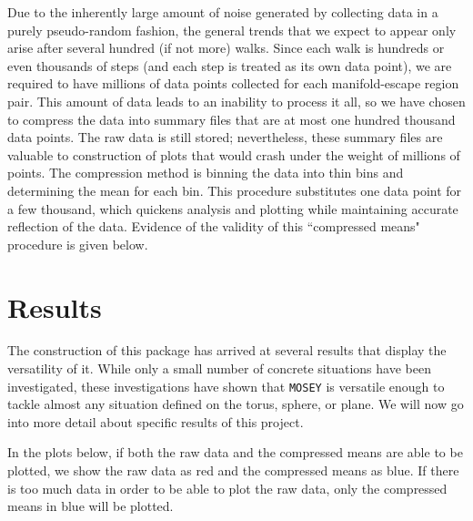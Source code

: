 \documentclass[12pt]{article}
\begin{document}
		Due to the inherently large amount of noise generated by collecting data in a purely pseudo-random fashion, the general trends that we expect to appear only arise after several hundred (if not more) walks.
		Since each walk is hundreds or even thousands of steps (and each step is treated as its own data point), we are required to have millions of data points collected for each manifold-escape region pair.
		This amount of data leads to an inability to process it all, so we have chosen to compress the data into summary files that are at most one hundred thousand data points.
		The raw data is still stored; nevertheless, these summary files are valuable to construction of plots that would crash under the weight of millions of points.
		The compression method is binning the data into thin bins and determining the mean for each bin.
		This procedure substitutes one data point for a few thousand, which quickens analysis and plotting while maintaining accurate reflection of the data.
		Evidence of the validity of this ``compressed means" procedure is given below.

\section{Results}
	The construction of this package has arrived at several results that display the versatility of it.
	While only a small number of concrete situations have been investigated, these investigations have shown that \texttt{MOSEY} is versatile enough to tackle almost any situation defined on the torus, sphere, or plane.
	We will now go into more detail about specific results of this project.
	
	In the plots below, if both the raw data and the compressed means are able to be plotted, we show the raw data as red and the compressed means as blue.
	If there is too much data in order to be able to plot the raw data, only the compressed means in blue will be plotted.
	
\end{document}
